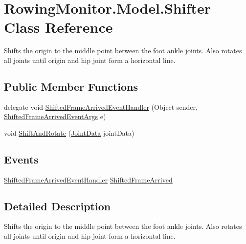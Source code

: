 \hypertarget{class_rowing_monitor_1_1_model_1_1_shifter}{}\section{Rowing\+Monitor.\+Model.\+Shifter Class Reference}
\label{class_rowing_monitor_1_1_model_1_1_shifter}


Shifts the origin to the middle point between the foot ankle joints. Also rotates all joints until origin and hip joint form a horizontal line.  


\subsection*{Public Member Functions}
\begin{DoxyCompactItemize}
\item 
delegate void \hyperlink{class_rowing_monitor_1_1_model_1_1_shifter_a094227f56757ab924211af7a74d0e205}{Shifted\+Frame\+Arrived\+Event\+Handler} (Object sender, \hyperlink{class_rowing_monitor_1_1_model_1_1_shifted_frame_arrived_event_args}{Shifted\+Frame\+Arrived\+Event\+Args} e)
\item 
void \hyperlink{class_rowing_monitor_1_1_model_1_1_shifter_a645e11ed09c90d94fb64ccbcbd12453f}{Shift\+And\+Rotate} (\hyperlink{struct_rowing_monitor_1_1_model_1_1_util_1_1_joint_data}{Joint\+Data} joint\+Data)
\end{DoxyCompactItemize}
\subsection*{Events}
\begin{DoxyCompactItemize}
\item 
\hyperlink{class_rowing_monitor_1_1_model_1_1_shifter_a094227f56757ab924211af7a74d0e205}{Shifted\+Frame\+Arrived\+Event\+Handler} \hyperlink{class_rowing_monitor_1_1_model_1_1_shifter_af95fddf9149c4aa965a6365180954cf7}{Shifted\+Frame\+Arrived}
\end{DoxyCompactItemize}


\subsection{Detailed Description}
Shifts the origin to the middle point between the foot ankle joints. Also rotates all joints until origin and hip joint form a horizontal line. 



